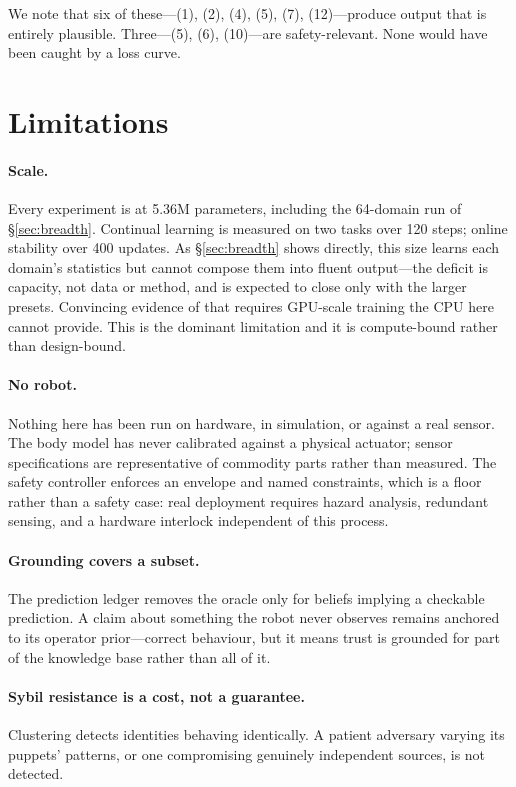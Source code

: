 \documentclass[10pt,twocolumn]{article}
\begin{document}
We note that six of these---(1), (2), (4), (5), (7), (12)---produce output that
is entirely plausible. Three---(5), (6), (10)---are safety-relevant. None would
have been caught by a loss curve.

\section{Limitations}
\label{sec:limitations}

\paragraph{Scale.} Every experiment is at 5.36M parameters, including the
64-domain run of \S\ref{sec:breadth}. Continual learning is measured on two
tasks over 120 steps; online stability over 400 updates. As
\S\ref{sec:breadth} shows directly, this size learns each domain's statistics
but cannot compose them into fluent output---the deficit is capacity, not data
or method, and is expected to close only with the larger presets. Convincing
evidence of that requires GPU-scale training the CPU here cannot provide. This
is the dominant limitation and it is compute-bound rather than design-bound.

\paragraph{No robot.} Nothing here has been run on hardware, in simulation, or
against a real sensor. The body model has never calibrated against a physical
actuator; sensor specifications are representative of commodity parts rather
than measured. The safety controller enforces an envelope and named constraints,
which is a floor rather than a safety case: real deployment requires hazard
analysis, redundant sensing, and a hardware interlock independent of this
process.

\paragraph{Grounding covers a subset.} The prediction ledger removes the oracle
only for beliefs implying a checkable prediction. A claim about something the
robot never observes remains anchored to its operator prior---correct behaviour,
but it means trust is grounded for part of the knowledge base rather than all
of it.

\paragraph{Sybil resistance is a cost, not a guarantee.} Clustering detects
identities behaving identically. A patient adversary varying its puppets'
patterns, or one compromising genuinely independent sources, is not detected.
\end{document}

